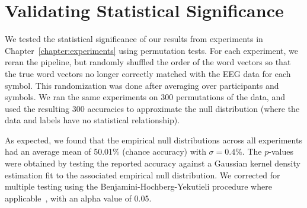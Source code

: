 \section{Validating Statistical Significance}
We tested the statistical significance of our results from experiments in 
Chapter~\ref{chapter:experiments} using permutation tests. For each experiment, 
we reran the pipeline, but randomly shuffled the order of the word vectors so 
that the true word vectors no longer correctly matched with the EEG data for 
each symbol. This randomization was done after averaging over participants and 
symbols. We ran the same experiments on 300 permutations of the data, and used 
the resulting 300 \tvt accuracies to approximate the null distribution (where 
the data and labels have no statistical relationship). 

As expected, we found that the empirical null distributions across all 
experiments had an average mean of 50.01\% (chance accuracy) with $\sigma = 
0.4\%$. The $p$-values were obtained by testing the reported accuracy against a 
Gaussian kernel density estimation fit to the associated empirical null 
distribution. We corrected for multiple testing using the 
Benjamini-Hochberg-Yekutieli procedure where 
applicable~\cite{benjamini2001control}, with an alpha value of 0.05.
